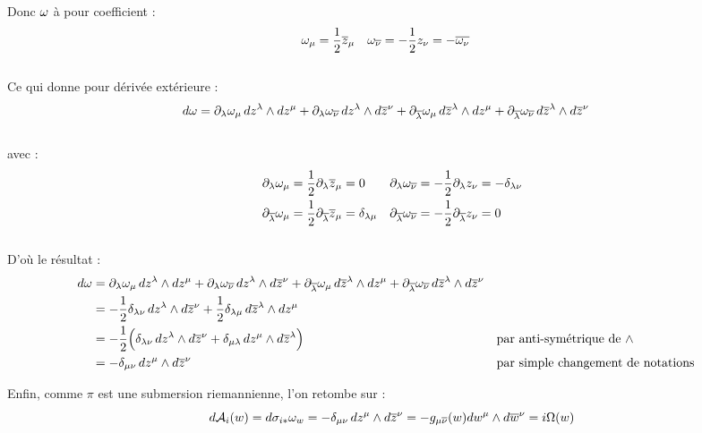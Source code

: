 Donc $\omega$ à pour coefficient :
\begin{align} \label{eq:sym2conn}
	\omega_\mu &= \frac{1}{2} \overline{z}_\mu  &  \omega_{\overline{\nu}} &= - \frac{1}{2} z_\nu = -\overline{\omega_\nu}
\end{align}
\\
Ce qui donne pour dérivée extérieure :
\begin{align*}
	d\omega &= \partial_\lambda\omega_\mu\, dz^\lambda \wedge dz^\mu 
	+ \partial_\lambda\omega_{\overline{\nu}}\, dz^\lambda \wedge d\overline{z}^\nu
	+ \partial_{\overline{\lambda}}\omega_\mu\, d\overline{z}^\lambda \wedge dz^\mu 
	+ \partial_{\overline{\lambda}}\omega_{\overline{\nu}}\, d\overline{z}^\lambda \wedge d\overline{z}^\nu
\end{align*}
\\
avec :
\begin{align*}
	\partial_\lambda \omega_\mu &= \frac{1}{2}\partial_\lambda \overline{z}_\mu = 0   &
	\partial_\lambda\omega_{\overline{\nu}} &= -\frac{1}{2}\partial_\lambda z_\nu = -\delta_{\lambda \nu} \\
	\partial_{\overline{\lambda}}\omega_\mu &= \frac{1}{2}\partial_{\overline{\lambda}} \overline{z}_\mu = \delta_{\lambda \mu}  &
	\partial_{\overline{\lambda}} \omega_{\overline{\nu}} &= -\frac{1}{2}\partial_{\overline{\lambda}} z_\nu = 0
\end{align*}
\\
D'où le résultat :
\begin{align*}
	d\omega &= \partial_\lambda\omega_\mu\, dz^\lambda \wedge dz^\mu 
	+ \partial_\lambda\omega_{\overline{\nu}}\, dz^\lambda \wedge d\overline{z}^\nu
	+ \partial_{\overline{\lambda}}\omega_\mu\, d\overline{z}^\lambda \wedge dz^\mu 
	+ \partial_{\overline{\lambda}}\omega_{\overline{\nu}}\, d\overline{z}^\lambda \wedge d\overline{z}^\nu \\
	&= -\frac{1}{2}\delta_{\lambda \nu}\, dz^\lambda \wedge d\overline{z}^\nu
	+ \frac{1}{2}\delta_{\lambda \mu}\, d\overline{z}^\lambda \wedge dz^\mu \\
	&= -\frac{1}{2}\Big( \delta_{\lambda \nu}\, dz^\lambda \wedge d\overline{z}^\nu + \delta_{\mu \lambda}\, dz^\mu \wedge d\overline{z}^\lambda \Big)  &  &\text{par anti-symétrique de $\wedge$}\\
	&= -\delta_{\mu \nu}\, dz^\mu \wedge d\overline{z}^\nu  &  &\text{par simple changement de notations}
\end{align*}
\skipl

Enfin, comme $\pi$ est une submersion riemannienne, l'on retombe sur :
\[d\mathcal{A}_i(w) = d\sigma_{i*}\omega_w = -\delta_{\mu \nu}\, dz^\mu \wedge d\overline{z}^\nu = -g_{\mu \overline{\nu}}(w) dw^\mu \wedge d\overline{w}^\nu = i\Omega(w)\]
\skipl


